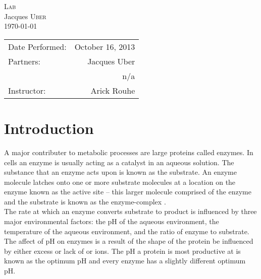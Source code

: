 \documentclass{article}
\begin{document}
\begin{center}
    \Large{\textsc{Lab}\\[0.2cm]}
    \large{Jacques \textsc{Uber}\\}
    \today\\
\end{center}

\begin{center}
\begin{tabular}{l r}
Date Performed: & October 16, 2013 \\ %
Partners: & Jacques Uber \\ %
& n/a \\
Instructor: & Arick Rouhe %
\end{tabular}
\end{center}


\section{Introduction}
\label{sec:introduction}
A major contributer to metabolic processes are large proteins called enzymes. In cells an enzyme is
usually acting as a catalyst in an aqueous solution. The substance that an enzyme acts upon is known
as the substrate. An enzyme molecule latches onto one or more substrate molecules at a location on
the enzyme known as the active site -- this larger molecule comprised of the enzyme and the
substrate is known as the enzyme-complex \cite{lab-manual}. \\

The rate at which an enzyme converts substrate to product is influenced by three major environmental
factors: the pH of the aqueous environment, the temperature of the aqueous environment, and the
ratio of enzyme to substrate. \\

The affect of pH on enzymes is a result of the shape of the protein be influenced by either excess
or lack of  or  ions. The pH a protein is most productive at is known as the optimum
pH and every enzyme has a slightly different optimum pH. \\
\end{document}
